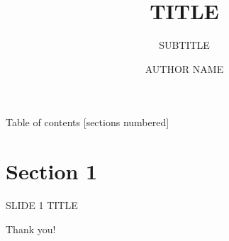 \documentclass[10pt,xcolor={dvipsnames},aspectratio=169]{beamer}
\title{TITLE}
\subtitle{SUBTITLE}
\date{}
\author{AUTHOR NAME}
\institute{INSTITUTE}
\begin{document}
\maketitle

\begin{frame}{Table of contents}
  [sections numbered]
  \tableofcontents%
\end{frame}

\section{Section 1}

\begin{frame}{SLIDE 1 TITLE}
\end{frame}


\begin{frame}[standout]
Thank you!
\end{frame}



%  

\end{document}
